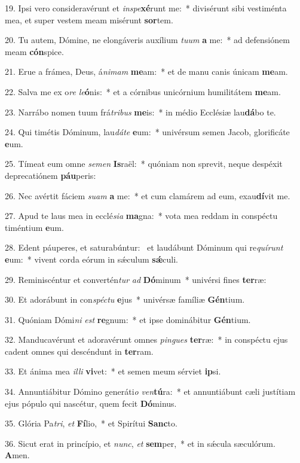19. Ipsi vero consideravérunt et \textit{in}\textit{spe}\textbf{xé}runt me:~*  divisérunt sibi vestiménta mea, et super vestem meam misérunt \textbf{sor}tem.\

20. Tu autem, Dómine, ne elongáveris auxílium \textit{tu}\textit{um} \textbf{a} me:~*  ad defensiónem meam \textbf{cón}spice.\

21. Erue a frámea, Deus, á\textit{ni}\textit{mam} \textbf{me}am:~*  et de manu canis únicam \textbf{me}am.\

22. Salva me ex o\textit{re} \textit{le}\textbf{ó}nis:~*  et a córnibus unicórnium humilitátem \textbf{me}am.\

23. Narrábo nomen tuum frá\textit{tri}\textit{bus} \textbf{me}is:~*  in médio Ecclésiæ lau\textbf{dá}bo te.\

24. Qui timétis Dóminum, lau\textit{dá}\textit{te} \textbf{e}um:~*  univérsum semen Jacob, glorificáte \textbf{e}um.\

25. Tímeat eum omne \textit{se}\textit{men} \textbf{Is}raël:~*  quóniam non sprevit, neque despéxit deprecatiónem \textbf{páu}peris:\

26. Nec avértit fáciem \textit{su}\textit{am} \textbf{a} me:~*  et cum clamárem ad eum, exau\textbf{dí}vit me.\

27. Apud te laus mea in ecclé\textit{si}\textit{a} \textbf{ma}gna:~*  vota mea reddam in conspéctu timéntium \textbf{e}um.\

28. Edent páuperes, et saturabúntur: \dag\  et laudábunt Dóminum qui re\textit{quí}\textit{runt} \textbf{e}um:~*  vivent corda eórum in sǽculum \textbf{sǽ}culi.\

29. Reminiscéntur et convertén\textit{tur} \textit{ad} \textbf{Dó}minum~*  univérsi fines \textbf{ter}ræ:\

30. Et adorábunt in con\textit{spéc}\textit{tu} \textbf{e}jus~*  univérsæ famíliæ \textbf{Gén}tium.\

31. Quóniam Dómi\textit{ni} \textit{est} \textbf{re}gnum:~*  et ipse dominábitur \textbf{Gén}tium.\

32. Manducavérunt et adoravérunt omnes \textit{pin}\textit{gues} \textbf{ter}ræ:~*  in conspéctu ejus cadent omnes qui descéndunt in \textbf{ter}ram.\

33. Et ánima mea \textit{il}\textit{li} \textbf{vi}vet:~*  et semen meum sérviet \textbf{ip}si.\

34. Annuntiábitur Dómino generáti\textit{o} \textit{ven}\textbf{tú}ra:~*  et annuntiábunt cæli justítiam ejus pópulo qui nascétur, quem fecit \textbf{Dó}minus.\

35. Glória Pa\textit{tri}, \textit{et} \textbf{Fí}lio,~*  et Spirítui \textbf{Sanc}to.\

36. Sicut erat in princípio, et \textit{nunc}, \textit{et} \textbf{sem}per,~*  et in sǽcula sæculórum. \textbf{A}men.\

